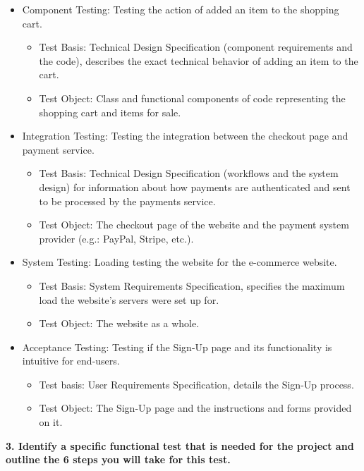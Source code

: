 \documentclass[a4paper,man,natbib]{apa6}
\begin{document}
\begin{itemize}
  \item Component Testing:  Testing the action of added an item to the shopping cart.
  \begin{itemize}
    \item	Test Basis: Technical Design Specification (component requirements and the code), describes the exact technical behavior of adding an item to the cart.
    \item	Test Object: Class and functional components of code representing the shopping cart and items for sale.
  \end{itemize}

  \item Integration Testing: Testing the integration between the checkout page and payment service.
  \begin{itemize}
    \item Test Basis: Technical Design Specification (workflows and the system design) for information about how payments are authenticated and sent to be processed by the payments service.
    \item	Test Object: The checkout page of the website and the payment system provider (e.g.: PayPal, Stripe, etc.).
  \end{itemize}

  \item System Testing: Loading testing the website for the e-commerce website.
  \begin{itemize}
    \item	Test Basis: System Requirements Specification, specifies the maximum load the website’s servers were set up for.
    \item	Test Object: The website as a whole.
  \end{itemize}

  \item Acceptance Testing: Testing if the Sign-Up page and its functionality is intuitive for end-users.
  \begin{itemize}
    \item	Test basis: User Requirements Specification, details the Sign-Up process.
    \item	Test Object: The Sign-Up page and the instructions and forms provided on it.
  \end{itemize}
\end{itemize}

\pagebreak
\noindent
\textbf{3. Identify a specific functional test that is needed for the project and outline the 6 steps you will take for this test.}\\
\end{document}
